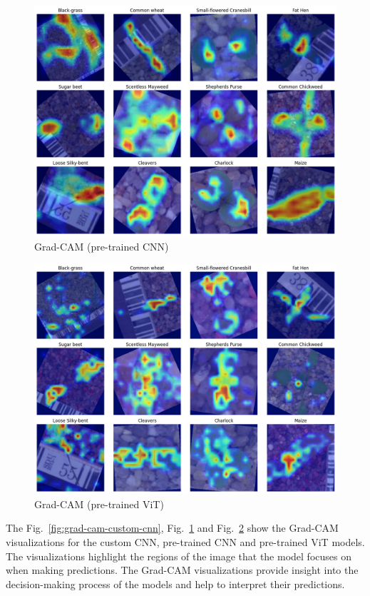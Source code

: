 \begin{figure}[htbp]
    \centerline{\includegraphics[width=0.9\linewidth]{../../resources/resnet/grad_cam.png}}
    \caption{Grad-CAM (pre-trained CNN)}
    \label{fig:grad-cam-pretrained-cnn}
\end{figure}

\begin{figure}[htbp]
    \centerline{\includegraphics[width=0.9\linewidth]{../../resources/vit/grad_cam.png}}
    \caption{Grad-CAM (pre-trained ViT)}
    \label{fig:grad-cam-pretrained-vit}
\end{figure}

The Fig.~\ref{fig:grad-cam-custom-cnn}, Fig.~\ref{fig:grad-cam-pretrained-cnn} and Fig.~\ref{fig:grad-cam-pretrained-vit} show the Grad-CAM visualizations for the custom CNN, pre-trained CNN and pre-trained ViT models. The visualizations highlight the regions of the image that the model focuses on when making predictions. The Grad-CAM visualizations provide insight into the decision-making process of the models and help to interpret their predictions.

